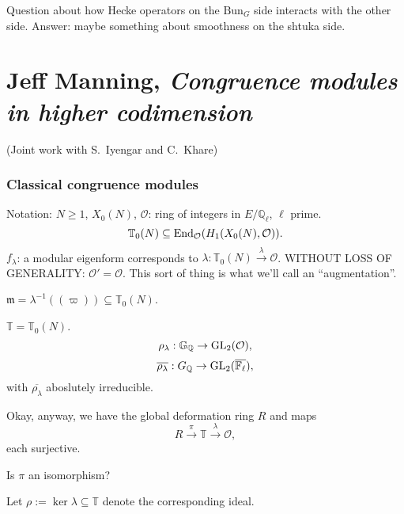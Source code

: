 \documentclass[reqno]{amsart} 
\begin{document}
Question about how Hecke operators on the $\mathrm{Bun}_G$ side interacts with the other side.  Answer: maybe something about smoothness on the shtuka side.

\part{Jeff Manning, \emph{Congruence modules in higher codimension}}

(Joint work with S.\ Iyengar and C.\ Khare)

\section{Classical congruence modules}
Notation: $N \geq 1$, $X_0(N)$, $\mathcal{O}$: ring of integers in $E / \mathbb{Q}_{\ell}$, $\ell$ prime.
\begin{equation*}
  \mathbb{T}_0(N) \subseteq \operatorname{End}_{\mathcal{O}}(H_1(X_0(N), \mathcal{O})).
\end{equation*}
$f_\lambda$: a modular eigenform corresponds to $\lambda : \mathbb{T}_0(N) \xrightarrow{\lambda} \mathcal{O}$.  WITHOUT LOSS OF GENERALITY: $\mathcal{O} ' = \mathcal{O}$.  This sort of thing is what we'll call an ``augmentation''.

$\mathfrak{m} = \lambda^{-1}((\varpi)) \subseteq \mathbb{T}_0(N)$.

$\mathbb{T} = \mathbb{T}_0(N)$.
\begin{equation*}
  \rho_\lambda : \mathbb{G}_{\mathbb{Q}} \rightarrow \operatorname{GL}_2(\mathcal{O}),
\end{equation*}
\begin{equation*}
  \overline{\rho_\lambda} : G_{\mathbb{Q}} \rightarrow \operatorname{GL}_2(\overline{\mathbb{F}_{\ell}}),
\end{equation*}
with $\overline{\rho_\lambda}$ aboslutely irreducible.

Okay, anyway, we have the global deformation ring $R$ and maps
\begin{equation*}
  R \xrightarrow{\pi} \mathbb{T} \xrightarrow{\lambda} \mathcal{O},
\end{equation*}
each surjective.
\begin{question}
  Is $\pi$ an isomorphism?
\end{question}

Let $\rho := \ker \lambda \subseteq \mathbb{T}$ denote the corresponding ideal.
\end{document}
